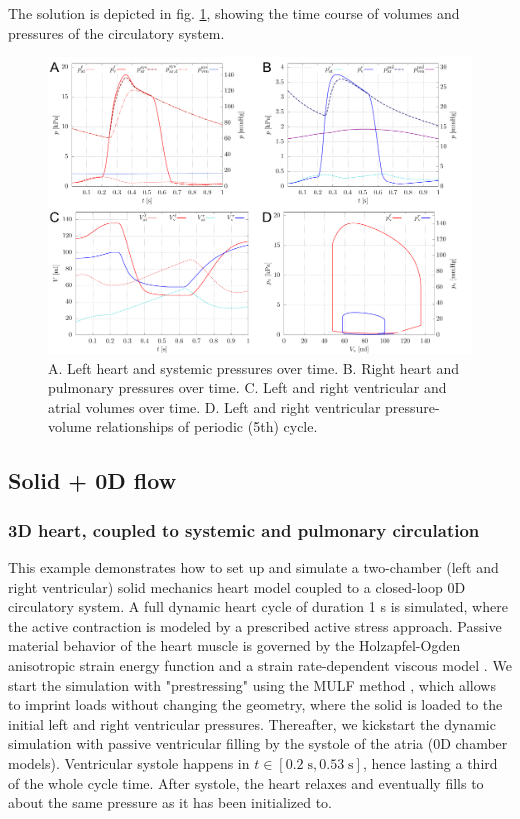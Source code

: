 \documentclass[a4paper,12pt]{report}
\begin{document}
The solution is depicted in fig. \ref{fig:syspul_results}, showing the time course of volumes and pressures of the circulatory system.

\begin{figure}
\centering
\includegraphics[width=1.0\textwidth]{fig/syspul_results.png}
\caption{A. Left heart and systemic pressures over time. B. Right heart and pulmonary pressures over time. C. Left and right ventricular and atrial volumes over time. D. Left and right ventricular pressure-volume relationships of periodic (5th) cycle.}
\label{fig:syspul_results}
\end{figure}


\subsection{Solid + 0D flow}\label{subsec:demos:solid_flow0d}

\subsubsection*{3D heart, coupled to systemic and pulmonary circulation}

This example demonstrates how to set up and simulate a two-chamber (left and right ventricular) solid mechanics heart model coupled to a closed-loop
0D circulatory system. A full dynamic heart cycle of duration 1 s is simulated, where the active contraction is modeled by a prescribed active stress approach.
Passive material behavior of the heart muscle is governed by the Holzapfel-Ogden anisotropic strain energy function \cite{holzapfel2009} and a strain rate-dependent viscous model \cite{chapelle2012}.
We start the simulation with "prestressing" using the MULF method \cite{gee2010,schein2021}, which allows to imprint loads without changing the geometry,
where the solid is loaded to the initial left and right ventricular pressures.
Thereafter, we kickstart the dynamic simulation with passive ventricular filling by the systole of the atria (0D chamber models). Ventricular systole
happens in $t \in [0.2\;\mathrm{s}, 0.53\;\mathrm{s}]$, hence lasting a third of the whole cycle time. After systole, the heart relaxes and eventually fills to about the same pressure
as it has been initialized to.\\
\end{document}
